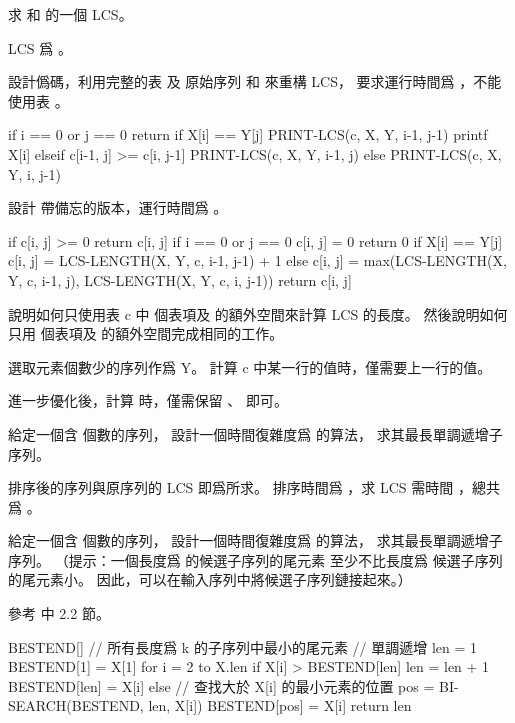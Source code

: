 \startsection[
  title={Longest common subsequence},
  reference=section:lcs,
]

\startEXERCISE
求  和  的一個 LCS。
\stopEXERCISE

\startANSWER
LCS 爲 。

\externalfigure[output/e15_4_1-1]
\stopANSWER

\startEXERCISE
設計僞碼，利用完整的表  及
原始序列 
和  來重構 LCS，
要求運行時間爲 ，不能使用表 。
\stopEXERCISE

\startANSWER
{}
\startCLRS
if i == 0 or j == 0
	return
if X[i] == Y[j]
	PRINT-LCS(c, X, Y, i-1, j-1)
	printf X[i]
elseif c[i-1, j] >= c[i, j-1]
	PRINT-LCS(c, X, Y, i-1, j)
else
	PRINT-LCS(c, X, Y, i, j-1)
\stopCLRS
\stopANSWER

\startEXERCISE
設計  帶備忘的版本，運行時間爲 。
\stopEXERCISE

\startANSWER
{}
\startCLRS
if c[i, j] >= 0
	return c[i, j]
if i == 0 or j == 0
	c[i, j] = 0
	return 0
if X[i] == Y[j]
	c[i, j] = LCS-LENGTH(X, Y, c, i-1, j-1) + 1
else
	c[i, j] = max(LCS-LENGTH(X, Y, c, i-1, j), LCS-LENGTH(X, Y, c, i, j-1))
return c[i, j]
\stopCLRS
\stopANSWER

\startEXERCISE
說明如何只使用表 c 中  個表項及  的額外空間來計算 LCS 的長度。
然後說明如何只用  個表項及  的額外空間完成相同的工作。
\stopEXERCISE

\startANSWER
選取元素個數少的序列作爲 Y。
計算 c 中某一行的值時，僅需要上一行的值。

進一步優化後，計算  時，僅需保留
、
 即可。
\stopANSWER

\startEXERCISE
給定一個含  個數的序列，
設計一個時間復雜度爲  的算法，
求其最長單調遞增子序列。
\stopEXERCISE

\startANSWER
排序後的序列與原序列的 LCS 即爲所求。
排序時間爲 ，求 LCS 需時間 ，總共爲 。
\stopANSWER

\startEXERCISE\DIFFICULT
給定一個含  個數的序列，
設計一個時間復雜度爲  的算法，
求其最長單調遞增子序列。
（{\EMP 提示：}一個長度爲  的候選子序列的尾元素
至少不比長度爲  候選子序列的尾元素小。
因此，可以在輸入序列中將候選子序列鏈接起來。）
\stopEXERCISE

\startANSWER
參考  中 2.2 節。

\startCLRS
BESTEND[]	// 所有長度爲 k 的子序列中最小的尾元素
		// 單調遞增
len = 1
BESTEND[1] = X[1]
for i = 2 to X.len
	if X[i] > BESTEND[len]
		len = len + 1
		BESTEND[len] = X[i]
	else
		// 查找大於 X[i] 的最小元素的位置
		pos = BI-SEARCH(BESTEND, len, X[i])
		BESTEND[pos] = X[i]
return len
\stopCLRS
\stopANSWER

\stopsection
